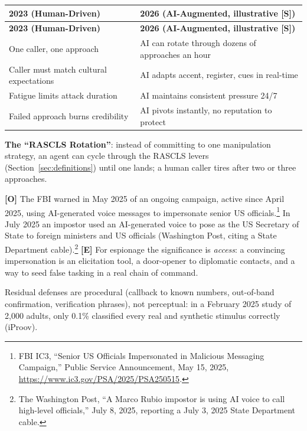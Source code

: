 \documentclass[11pt,letterpaper]{article}
\newcommand{\etraneed}[1]{\par\ifdim\pagegoal<\maxdimen\ifdim\pagetotal<\pagegoal\ifdim\dimexpr\pagegoal-\pagetotal\relax<\dimexpr#1\relax\newpage\fi\fi\fi}
\begin{document}
\etraneed{10\baselineskip}
{\small
\begin{longtable}{L{5cm}L{7cm}}
\toprule
\textbf{2023 (Human-Driven)} & \textbf{2026 (AI-Augmented, illustrative [S])} \\
\midrule
\endfirsthead
\toprule
\textbf{2023 (Human-Driven)} & \textbf{2026 (AI-Augmented, illustrative [S])} \\
\midrule
\endhead
One caller, one approach & AI can rotate through dozens of approaches an hour \\*
Caller must match cultural expectations & AI adapts accent, register, cues in real-time \\
Fatigue limits attack duration & AI maintains consistent pressure 24/7 \\*
Failed approach burns credibility & AI pivots instantly, no reputation to protect \\
\bottomrule
\end{longtable}}

\textbf{The ``RASCLS Rotation''}: instead of committing to one manipulation strategy, an agent can cycle through the RASCLS levers (Section~\ref{sec:definitions}) until one lands; a human caller tires after two or three approaches.

\begin{warnbox}
\textbf{[O]} The FBI warned in May 2025 of an ongoing campaign, active since April 2025, using AI-generated voice messages to impersonate senior US officials.\footnote{FBI IC3, ``Senior US Officials Impersonated in Malicious Messaging Campaign,'' Public Service Announcement, May 15, 2025, \url{https://www.ic3.gov/PSA/2025/PSA250515}.} In July 2025 an impostor used an AI-generated voice to pose as the US Secretary of State to foreign ministers and US officials (Washington Post, citing a State Department cable).\footnote{The Washington Post, ``A Marco Rubio impostor is using AI voice to call high-level officials,'' July 8, 2025, reporting a July 3, 2025 State Department cable.} \textbf{[E]} For espionage the significance is \textit{access}: a convincing impersonation is an elicitation tool, a door-opener to diplomatic contacts, and a way to seed false tasking in a real chain of command.

Residual defenses are procedural (callback to known numbers, out-of-band confirmation, verification phrases), not perceptual: in a February 2025 study of 2,000 adults, only 0.1\% classified every real and synthetic stimulus correctly (iProov).
\end{warnbox}
\end{document}
